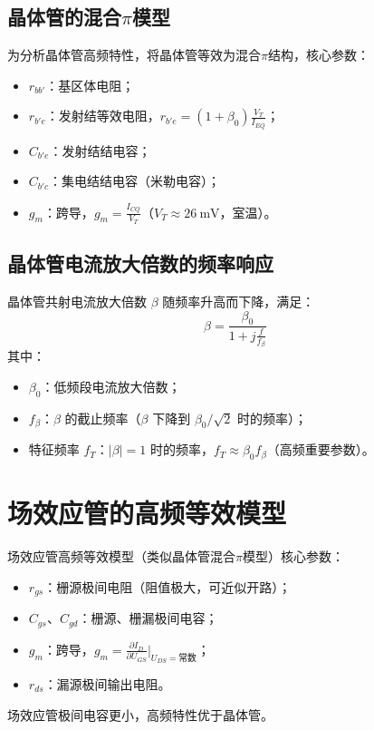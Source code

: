 \subsection{\texorpdfstring{晶体管的混合$\pi$模型}{晶体管的混合pi模型}}
为分析晶体管高频特性，将晶体管等效为混合$\pi$结构，核心参数：
\begin{itemize}
    \item $r_{bb'}$：基区体电阻；
    \item $r_{b'e}$：发射结等效电阻，$r_{b'e} = (1+\beta_0) \frac{V_T}{I_{EQ}}$；
    \item $C_{b'e}$：发射结结电容；
    \item $C_{b'c}$：集电结结电容（米勒电容）；
    \item $g_m$：跨导，$g_m = \frac{I_{CQ}}{V_T}$（$V_T \approx 26\ \text{mV}$，室温）。
\end{itemize}

\subsection{\texorpdfstring{晶体管电流放大倍数的频率响应}{晶体管电流放大倍数的频率响应}}
晶体管共射电流放大倍数 $\beta$ 随频率升高而下降，满足：
\[ \beta = \frac{\beta_0}{1 + j\frac{f}{f_\beta}} \]
其中：
\begin{itemize}
    \item $\beta_0$：低频段电流放大倍数；
    \item $f_\beta$：$\beta$ 的截止频率（$\beta$ 下降到 $\beta_0/\sqrt{2}$ 时的频率）；
    \item 特征频率 $f_T$：$|\beta|=1$ 时的频率，$f_T \approx \beta_0 f_\beta$（高频重要参数）。
\end{itemize}

\section{\texorpdfstring{场效应管的高频等效模型}{场效应管的高频等效模型}}
场效应管高频等效模型（类似晶体管混合$\pi$模型）核心参数：
\begin{itemize}
    \item $r_{gs}$：栅源极间电阻（阻值极大，可近似开路）；
    \item $C_{gs}$、$C_{gd}$：栅源、栅漏极间电容；
    \item $g_m$：跨导，$g_m = \frac{\partial I_D}{\partial U_{GS}} \big|_{U_{DS}=\text{常数}}$；
    \item $r_{ds}$：漏源极间输出电阻。
\end{itemize}
场效应管极间电容更小，高频特性优于晶体管。

